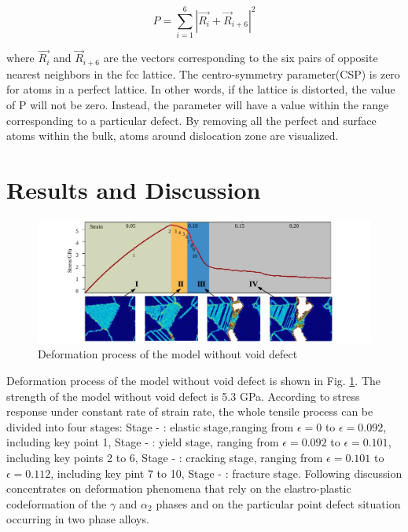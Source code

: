 \documentclass[Unknown,article,submit,moreauthors,pdftex,10pt,a4paper]{Definitions/mdpi}
\begin{document}
	\begin{equation} \label{eq:csp} 
	P = \displaystyle\sum_{i=1}^{6}|\vec{R_i}+{\vec{R}}_{i+6}|^2
	\end{equation}
	
where $\vec{R_i}$ and ${\vec{R}}_{i+6}$ are the vectors corresponding to the six pairs of opposite nearest neighbors in the fcc lattice. The centro-symmetry parameter(CSP) is zero for atoms in a perfect lattice. In other words, if the lattice is distorted, the value of P will not be zero. Instead, the parameter will have a value within the range corresponding to a particular defect. By removing all the perfect and surface atoms within the bulk, atoms around dislocation zone are visualized. 
 
\section{Results and Discussion}\label{section:RD}

\begin{figure}[ht]
	\centering
	\includegraphics[width=1\linewidth]{img/tens}
	\caption{Deformation process of the model without void defect}
	\label{fig:deformation-pf}
\end{figure}


Deformation process of the model without void defect is shown in Fig. \ref{fig:deformation-pf}. The strength of the model without void defect is 5.3 GPa. According to stress response under constant rate of strain rate, the whole tensile process can be divided into four stages: 
Stage - \uppercase\expandafter{}: elastic stage,ranging from $\epsilon = 0$ to $\epsilon = 0.092$, including key point 1,
Stage - \uppercase\expandafter{}: yield stage, ranging from $\epsilon = 0.092$ to $\epsilon = 0.101$, including key points 2 to 6,
Stage - \uppercase\expandafter{}: cracking stage, ranging from $\epsilon = 0.101$ to $\epsilon = 0.112$, including key pint 7 to 10,
Stage - \uppercase\expandafter{}: fracture stage. Following discussion concentrates on deformation phenomena that rely on the elastro-plastic codeformation of the $\gamma$ and $\alpha_2$ phases and on the particular point defect situation occurring in two phase alloys. 
\end{document}
